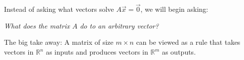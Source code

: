 \begin{figure}[H]
\begin{tikzpicture}[x=0.75pt,y=0.75pt,yscale=-1,xscale=1]
    \end{tikzpicture}
    \label{fig:transformationDiagram}
\end{figure}

Instead of asking what vectors solve $A\vec{x}=\vec{0}$, we will begin asking:

\textit{What does the matrix $A$ do to an arbitrary vector?}

The big take away: A matrix of size $m\times n$ can be viewed as a rule that takes vectors in $\mathbb{R}^n$ as inputs and produces vectors in $\mathbb{R}^m$ as outputs.

